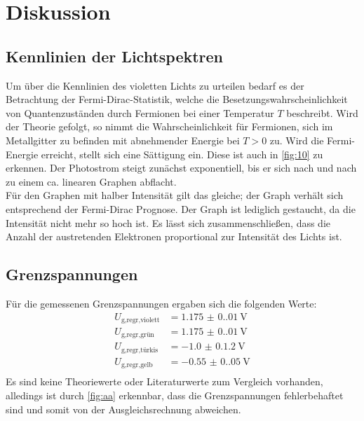 \section{Diskussion}
\label{sec:Diskussion}

\subsection{Kennlinien der Lichtspektren}
Um über die Kennlinien des violetten Lichts zu urteilen bedarf es der 
Betrachtung der Fermi-Dirac-Statistik, welche die Besetzungswahrscheinlichkeit 
von Quantenzuständen durch Fermionen bei einer Temperatur $T$ beschreibt.
Wird der Theorie gefolgt, so nimmt die Wahrscheinlichkeit für Fermionen, sich
im Metallgitter zu befinden mit abnehmender Energie bei $T>0$ zu. Wird die 
Fermi-Energie erreicht, stellt sich eine Sättigung ein. Diese ist auch in 
\autoref{fig:10} zu erkennen. Der Photostrom steigt zunächst exponentiell, 
bis er sich nach und nach zu einem ca. linearen Graphen abflacht.
\vspace{0.5em}
\\
Für den Graphen mit halber Intensität gilt das gleiche; der Graph verhält sich 
entsprechend der Fermi-Dirac Prognose. Der Graph ist lediglich gestaucht, da 
die Intensität nicht mehr so hoch ist. Es lässt sich zusammenschließen, dass 
die Anzahl der austretenden Elektronen proportional zur Intensität des Lichts 
ist.

\subsection{Grenzspannungen}
Für die gemessenen Grenzspannungen ergaben sich die folgenden Werte:
\begin{align*}
    U_\text{g,regr,violett} &= \qty{1.175(0.01)}{\volt} \\
    U_\text{g,regr,grün}   &= \qty{1.175(0.01)}{\volt} \\
    U_\text{g,regr,türkis} &= \qty{-1.0(0.12)}{\volt}  \\
    U_\text{g,regr,gelb}    &= \qty{-0.55(0.05)}{\volt} \\
\end{align*}
Es sind keine Theoriewerte oder Literaturwerte zum Vergleich vorhanden, alledings 
ist durch \autoref{fig:aa} erkennbar, dass die Grenzspannungen fehlerbehaftet
sind und somit von der Ausgleichsrechnung abweichen.

